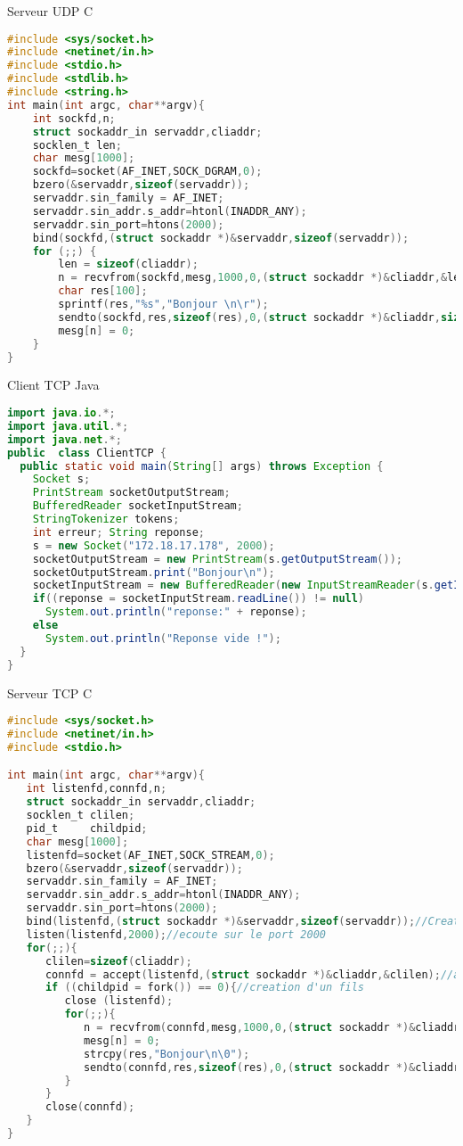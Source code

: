 \documentclass{article}
\begin{document}
Serveur UDP C
\begin{lstlisting}[language=c]
#include <sys/socket.h>
#include <netinet/in.h>
#include <stdio.h>
#include <stdlib.h>
#include <string.h>
int main(int argc, char**argv){
    int sockfd,n;
    struct sockaddr_in servaddr,cliaddr;
    socklen_t len;
    char mesg[1000];
    sockfd=socket(AF_INET,SOCK_DGRAM,0);
    bzero(&servaddr,sizeof(servaddr));
    servaddr.sin_family = AF_INET;
    servaddr.sin_addr.s_addr=htonl(INADDR_ANY);
    servaddr.sin_port=htons(2000);
    bind(sockfd,(struct sockaddr *)&servaddr,sizeof(servaddr));
    for (;;) {
        len = sizeof(cliaddr);
        n = recvfrom(sockfd,mesg,1000,0,(struct sockaddr *)&cliaddr,&len);
        char res[100];
        sprintf(res,"%s","Bonjour \n\r");
        sendto(sockfd,res,sizeof(res),0,(struct sockaddr *)&cliaddr,sizeof(cliaddr));
        mesg[n] = 0;
    }
}
\end{lstlisting}
Client TCP Java
\begin{lstlisting}[language=JAVA]
import java.io.*;
import java.util.*;
import java.net.*;
public  class ClientTCP {
  public static void main(String[] args) throws Exception {
    Socket s;
    PrintStream socketOutputStream;
    BufferedReader socketInputStream;
    StringTokenizer tokens;
    int erreur; String reponse;
    s = new Socket("172.18.17.178", 2000);
    socketOutputStream = new PrintStream(s.getOutputStream());
    socketOutputStream.print("Bonjour\n");
    socketInputStream = new BufferedReader(new InputStreamReader(s.getInputStream()));
    if((reponse = socketInputStream.readLine()) != null)
      System.out.println("reponse:" + reponse);
    else
      System.out.println("Reponse vide !");
  }
}
\end{lstlisting}

Serveur TCP C
\begin{lstlisting}[language=c]
#include <sys/socket.h>
#include <netinet/in.h>
#include <stdio.h>

int main(int argc, char**argv){
   int listenfd,connfd,n;
   struct sockaddr_in servaddr,cliaddr;
   socklen_t clilen;
   pid_t     childpid;
   char mesg[1000];
   listenfd=socket(AF_INET,SOCK_STREAM,0);
   bzero(&servaddr,sizeof(servaddr));
   servaddr.sin_family = AF_INET;
   servaddr.sin_addr.s_addr=htonl(INADDR_ANY);
   servaddr.sin_port=htons(2000);
   bind(listenfd,(struct sockaddr *)&servaddr,sizeof(servaddr));//Creation de la socket
   listen(listenfd,2000);//ecoute sur le port 2000
   for(;;){
      clilen=sizeof(cliaddr);
      connfd = accept(listenfd,(struct sockaddr *)&cliaddr,&clilen);//acceptation de la connection
      if ((childpid = fork()) == 0){//creation d'un fils
         close (listenfd);
         for(;;){
            n = recvfrom(connfd,mesg,1000,0,(struct sockaddr *)&cliaddr,&clilen);
            mesg[n] = 0;
            strcpy(res,"Bonjour\n\0");
            sendto(connfd,res,sizeof(res),0,(struct sockaddr *)&cliaddr,sizeof(cliaddr));
         }
      }
      close(connfd);
   }
}
\end{lstlisting}
\end{document}
